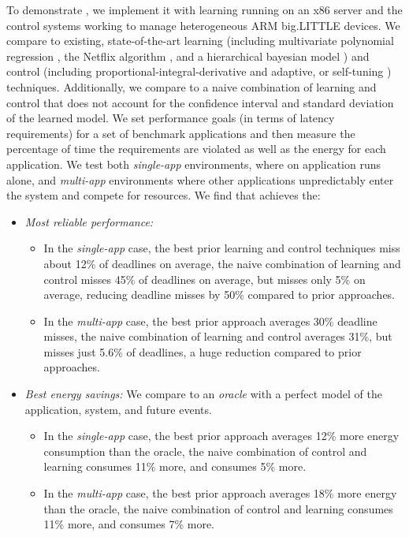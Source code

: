 To demonstrate \SYSTEM{}, we implement it with learning running on an
x86 server and the control systems working to manage heterogeneous ARM
big.LITTLE devices.  We compare \SYSTEM{} to existing,
state-of-the-art learning (including multivariate polynomial
regression \cite{}, the Netflix algorithm \cite{}, and a hierarchical
bayesian model \cite{}) and control (including
proportional-integral-derivative \cite{} and adaptive, or self-tuning
\cite{}) techniques.  Additionally, we compare to a naive combination
of learning and control that does not account for the confidence
interval and standard deviation of the learned model.  We set
performance goals (in terms of latency requirements) for a set of
benchmark applications and then measure the percentage of time the
requirements are violated as well as the energy for each application.
We test both \emph{single-app} environments, where on application runs
alone, and \emph{multi-app} environments where other applications
unpredictably enter the system and compete for resources.  We find
that \SYSTEM{} achieves the:
\begin{itemize} 
\item \textit{Most reliable performance:} 
 \begin{itemize} 
 \item In the \emph{single-app} case, the best prior learning and
   control techniques miss about 12\% of deadlines on average, the
   naive combination of learning and control misses 45\% of deadlines
   on average, but \SYSTEM{} misses only 5\% on average, reducing
   deadline misses by 50\% compared to prior approaches.
 \item In the \emph{multi-app} case, the best prior approach averages
   30\% deadline misses, the naive combination of learning and control
   averages 31\%, but \SYSTEM{} misses just 5.6\% of deadlines, a huge
   reduction compared to prior approaches.
\end{itemize}
  \item \textit{Best energy savings:} We compare to an \emph{oracle}
    with a perfect model of the application, system, and future
    events.
    \begin{itemize}
    \item In the \emph{single-app} case, the best prior approach
      averages 12\% more energy consumption than the oracle, the naive
      combination of control and learning consumes 11\% more, and
      \SYSTEM{} consumes 5\% more.  
    \item In the \emph{multi-app} case, the best prior approach
      averages 18\% more energy than the oracle, the naive combination
      of control and learning consumes 11\% more, and \SYSTEM{}
      consumes 7\% more.
    \end{itemize}
\end{itemize}

